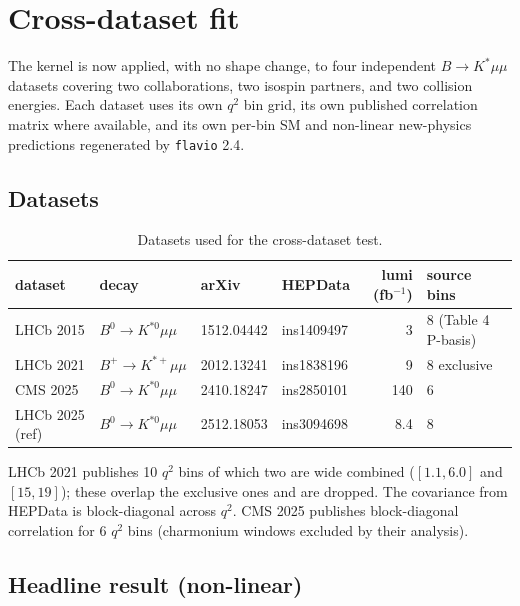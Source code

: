 \section{Cross-dataset fit}\label{sec:cross-dataset}

The kernel is now applied, with no shape change, to four independent
$B \to K^{*}\mu\mu$ datasets covering two collaborations, two
isospin partners, and two collision energies. Each dataset uses its
own $q^{2}$ bin grid, its own published correlation matrix where
available, and its own per-bin SM and non-linear new-physics
predictions regenerated by \texttt{flavio} 2.4.

\subsection{Datasets}

\begin{table}[h]
\centering
\small
\begin{tabular}{llllrl}
\toprule
dataset & decay & arXiv & HEPData & lumi (fb$^{-1}$) & source bins \\
\midrule
LHCb 2015         & $B^{0}\to K^{*0}\mu\mu$  & 1512.04442 & ins1409497 & 3   & 8 (Table 4 P-basis) \\
LHCb 2021         & $B^{+}\to K^{*+}\mu\mu$  & 2012.13241 & ins1838196 & 9   & 8 exclusive \\
CMS 2025          & $B^{0}\to K^{*0}\mu\mu$  & 2410.18247 & ins2850101 & 140 & 6 \\
LHCb 2025 (ref)   & $B^{0}\to K^{*0}\mu\mu$  & 2512.18053 & ins3094698 & 8.4 & 8 \\
\bottomrule
\end{tabular}
\caption{Datasets used for the cross-dataset test.}
\label{tab:cross_dataset_summary}
\end{table}

LHCb 2021 publishes 10 $q^{2}$ bins of which two are wide combined
($[1.1,6.0]$ and $[15,19]$); these overlap the exclusive ones and are
dropped. The covariance from HEPData is block-diagonal across $q^{2}$.
CMS 2025 publishes block-diagonal correlation for 6 $q^{2}$ bins
(charmonium windows excluded by their analysis).

\subsection{Headline result (non-linear)}\label{subsec:cross_headline_nl}

